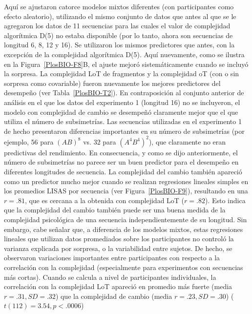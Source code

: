 Aquí se ajustaron catorce modelos mixtos diferentes (con participantes como efecto aleatorio), utilizando el mismo conjunto de datos que antes al que se le agregaron los datos de 11 secuencias para las cuales el valor de complejidad algorítmica D(5) no estaba disponible (por lo tanto, ahora son secuencias de longitud 6, 8, 12 y 16). Se utilizaron los mismos predictores que antes, con la excepción de la complejidad algorítmica D(5). Aquí nuevamente, como se ilustra en la Figura~\ref{PlosBIO-F8}B, el ajuste mejoró sistemáticamente cuando se incluyó la sorpresa. La complejidad LoT de fragmentos y la complejidad oT (con o sin sorpresa como covariable) fueron nuevamente los mejores predictores del desempeño (ver Tabla~\ref{PlosBIO-T2}). En contraposición al conjunto anterior de análisis en el que los datos del experimento 1 (longitud 16) no se incluyeron, el modelo con complejidad de cambio se desempeñó claramente mejor que el que utiliza el número de subsimetrías. Las secuencias utilizadas en el experimento 1 de hecho presentaron diferencias importantes en su número de subsimetrías (por ejemplo, 56 para $(AB)^8$ vs. 32 para $(A^4B^4)^2$), que claramente no eran predictivas del rendimiento. En consecuencia, y como se dijo anteriormente, el número de subsimetrías no parece ser un buen predictor para el desempeño en diferentes longitudes de secuencia. La complejidad del cambio también apareció como un predictor mucho mejor cuando se realizan regresiones lineales simples en los promedios LISAS por secuencia (ver Figura~\ref{PlosBIO-F9}), resultando en una $r = .81$, que es cercana a la obtenida con complejidad LoT ($r = .82$). Esto indica que la complejidad del cambio también puede ser una buena medida de la complejidad psicológica de una secuencia independientemente de su longitud. Sin embargo, cabe señalar que, a diferencia de los modelos mixtos, estas regresiones lineales que utilizan datos promediados sobre los participantes no controló la varianza explicada por sorpresa, o la variabilidad entre sujetos. De hecho, se observaron variaciones importantes entre participantes con respecto a la correlación con la complejidad (especialmente para experimentos con secuencias más cortas). Cuando se calcula a nivel de participantes individuales, la correlación con la complejidad LoT apareció en promedio más fuerte (media $r = .31, SD = .32$) que la complejidad de cambio (media $r = .23, SD = .30$) ($t (112) = 3.54, p < .0006$)

